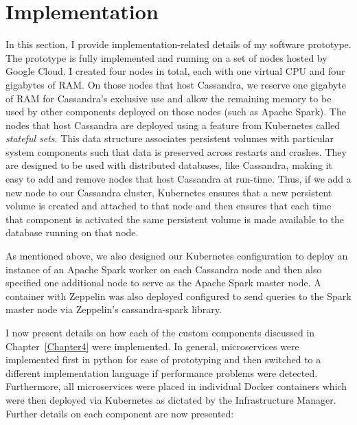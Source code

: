 
\chapter{Implementation} %

\label{Chapter5} %

In this section, I provide implementation-related details of my software prototype. The prototype is fully implemented and running on a set of nodes hosted by Google Cloud. I created four nodes in total, each with one virtual CPU and four gigabytes of RAM. On those nodes that host Cassandra, we reserve one gigabyte of RAM for Cassandra’s exclusive use and allow the remaining memory to be used by other components deployed on those nodes (such as Apache Spark). The nodes that host Cassandra are deployed using a feature from Kubernetes called \textit{stateful sets}. This data structure associates persistent volumes with particular system components such that data is preserved across restarts and crashes. They are designed to be used with distributed databases, like Cassandra, making it easy to add and remove nodes that host Cassandra at run-time. Thus, if we add a new node to our Cassandra cluster, Kubernetes ensures that a new persistent volume is created and attached to that node and then ensures that each time that component is activated the same persistent volume is made available to the database running on that node.

As mentioned above, we also designed our Kubernetes configuration to deploy an instance of an Apache Spark worker on each Cassandra node and then also specified one additional node to serve as the Apache Spark master node. A container with Zeppelin was also deployed configured to send queries to the Spark master node via Zeppelin’s cassandra-spark library.

I now present details on how each of the custom components discussed in Chapter~\ref{Chapter4} were implemented. In general, microservices were implemented first in python for ease of prototyping and then switched to a different implementation language if performance problems were detected. Furthermore, all microservices were placed in individual Docker containers which were then deployed via Kubernetes as dictated by the Infrastructure Manager. Further details on each component are now presented:

